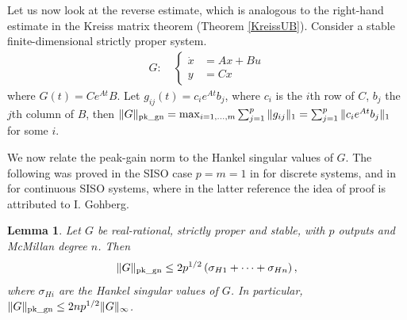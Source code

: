 \documentclass[12pt, a4paper,reqno]{amsart}
\newtheorem{lemma}{\bf Lemma}
\theoremstyle{definition}
\begin{document}
Let us now look at the reverse estimate, which is analogous to the right-hand estimate in the Kreiss matrix theorem
(Theorem \ref{KreissUB}). 
Consider a
stable finite-dimensional strictly proper system.
\begin{align*}
G: \quad
\left\{ \begin{array}{lll}
\dot{x} &= Ax + Bu\\
y &= Cx
\end{array} \right.
\end{align*}
where $G(t) = C e^{At}B$. Let $g_{ij}(t) = c_i e^{At}b_j$, where $c_i$ is the $i$th row of $C$, $b_j$ the $j$th column of $B$, then
$\|G\|_{\rm pk\_gn} =  \max_{i=1,\dots,m} \sum_{j=1}^p \|g_{ij}\|_1=\sum_{j=1}^p \|c_ie^{At}b_j\|_1$ for some $i$. 


We now relate the peak-gain norm to the Hankel singular values of $G$.
The following was proved in the SISO case $p=m=1$ in \cite[Thm. 2]{boyd_doyle} for  discrete systems,
and in \cite[pp. 11-12]{mil} for continuous SISO systems, where in the latter reference the idea of proof is attributed to I. Gohberg.

\begin{lemma}
\label{sigmas_lemma}
Let $G$ be real-rational, strictly proper and stable, with $p$ outputs and McMillan degree $n$.
Then
\begin{equation}
\label{sigmas}
\|G\|_{\rm pk\_gn} \leq 2{p}^{1/2} \left( \sigma_{H1} + \dots + \sigma_{Hn}  \right), 
\end{equation}
where $\sigma_{Hi}$ are the Hankel singular
values of $G$. In particular, $\|G\|_{\rm pk\_gn} \leq 2n {p}^{1/2} \|G\|_\infty$.
\end{lemma}
\end{document}

